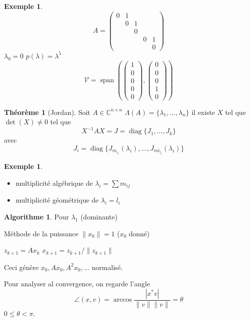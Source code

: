\documentclass[11pt,a4paper]{article}
\newcommand{\C}{\mathbb{C}}
\newcommand{\Cnn}{\C^{n\times n}}
\newcommand{\V}{\mathcal{V}}
\theoremstyle{definition}
\newtheorem{mytheo}[mydef]{Théorème}
\newtheorem{myexem}[mydef]{Exemple}
\newtheorem{myalgo}[mydef]{Algorithme}
\DeclareMathOperator{\myspan}{span}
\DeclareMathOperator{\diag}{diag}
\begin{document}
\begin{myexem}
  $$
  A = \begin{pmatrix}
    0 & 1\\
      & 0 & 1\\
      &   & 0\\
      &   &   & 0 & 1\\
      &   &   &   & 0
  \end{pmatrix}
  $$
  $\lambda_0 = 0$ $p(\lambda) = \lambda^5$
  $$
  \V = \myspan(
  \begin{pmatrix}
    1\\0\\0\\0\\0
  \end{pmatrix},
  \begin{pmatrix}
    0\\0\\0\\1\\0
  \end{pmatrix}
  )
  $$
\end{myexem}

\begin{mytheo}[Jordan]
  Soit $A \in \Cnn$ $\Lambda(A) = \{\lambda_1,\ldots,\lambda_n\}$
  il existe $X$ tel que $\det(X) \neq 0$ tel que
  $$X^{-1}AX = J = \diag\{J_1,\ldots,J_k\}$$
  avec
  $$J_i = \diag\{J_{m_{i_1}}(\lambda_i),\ldots,J_{m{i_{l_i}}}(\lambda_i)\}$$
\end{mytheo}

\begin{myexem}
  \begin{itemize}
    \item multiplicité algébrique de $\lambda_i = \sum m_{ij}$
    \item multiplicité géométrique de $\lambda_i = l_i$
  \end{itemize}
\end{myexem}

\begin{myalgo}
  Pour $\lambda_1$ (dominante)
  \begin{algorithm}
    \caption{Méthode de la puissance $\|x_0\| = 1$ ($x_0$ donné)}
    \label{algo:puissance}
    \begin{algorithmic}
      \STATE $z_{k+1} = Ax_k$
      \STATE $x_{k+1} = z_{k+1}/\|z_{k+1}\|$
      \ENDFOR
    \end{algorithmic}
  \end{algorithm}
  Ceci génère $x_0, Ax_0, A^2x_0, \ldots$ normalisé.

  Pour analyser al convergence, on regarde l'angle
  $$\angle(x,v) = \arccos\frac{|x^*v|}{\|v\|\|v\|} = \theta$$
  $0 \leq \theta < \pi$.
\end{myalgo}
\end{document}

